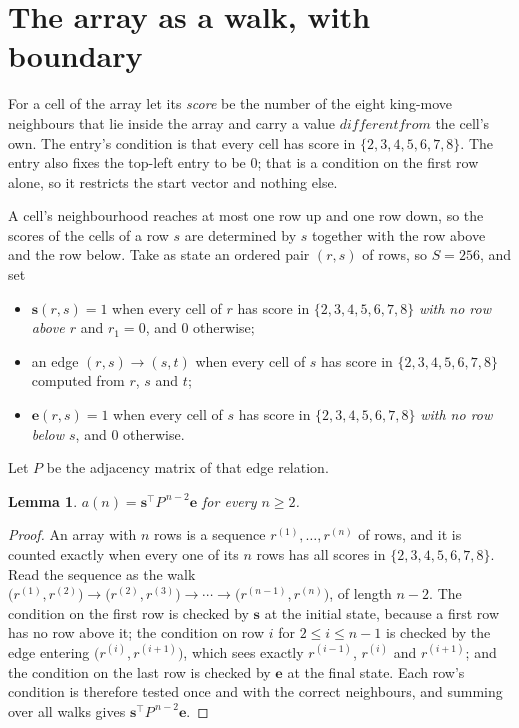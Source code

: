 \documentclass[11pt,a4paper]{article}
\theoremstyle{plain}
\newtheorem{lemma}[theorem]{Lemma}
\theoremstyle{definition}
\begin{document}
\section{The array as a walk, with boundary}

For a cell of the array let its \emph{score} be the number of the eight king-move neighbours that lie inside
the array and carry a value $different from$ the cell's own. The entry's condition is that every cell
has score in $\{2,3,4,5,6,7,8\}$. The entry also fixes the top-left entry to be $0$; that is a condition on the first row alone, so it restricts the start vector and nothing else.

A cell's neighbourhood reaches at most one row up and one row down, so the scores of the
cells of a row $s$ are determined by $s$ together with the row above and the row below.
Take as state an ordered pair $(r,s)$ of rows, so $S=256$, and set
\begin{itemize}
\item $\mathbf{s}(r,s)=1$ when every cell of $r$ has score in $\{2,3,4,5,6,7,8\}$ \emph{with no row
above $r$} and $r_1=0$, and $0$ otherwise;
\item an edge $(r,s)\to(s,t)$ when every cell of $s$ has score in $\{2,3,4,5,6,7,8\}$ computed from
$r$, $s$ and $t$;
\item $\mathbf{e}(r,s)=1$ when every cell of $s$ has score in $\{2,3,4,5,6,7,8\}$ \emph{with no row
below $s$}, and $0$ otherwise.
\end{itemize}
Let $P$ be the adjacency matrix of that edge relation.

\begin{lemma}\label{lem:walk}
$a(n)=\mathbf{s}^{\!\top}P^{\,n-2}\mathbf{e}$ for every $n\ge2$.
\end{lemma}

\begin{proof}
An array with $n$ rows is a sequence $r^{(1)},\dots,r^{(n)}$ of rows, and it is counted
exactly when every one of its $n$ rows has all scores in $\{2,3,4,5,6,7,8\}$. Read the sequence as the
walk $\bigl(r^{(1)},r^{(2)}\bigr)\to\bigl(r^{(2)},r^{(3)}\bigr)\to\cdots\to
\bigl(r^{(n-1)},r^{(n)}\bigr)$, of length $n-2$. The condition on the first row is
checked by $\mathbf{s}$ at the initial state, because a first row has no row above it; the
condition on row $i$ for $2\le i\le n-1$ is checked by the edge entering
$\bigl(r^{(i)},r^{(i+1)}\bigr)$, which sees exactly $r^{(i-1)}$, $r^{(i)}$ and
$r^{(i+1)}$; and the condition on the last row is checked by $\mathbf{e}$ at the final
state. Each row's condition is therefore tested once and with the correct neighbours, and
summing over all walks gives $\mathbf{s}^{\!\top}P^{\,n-2}\mathbf{e}$.
\end{proof}
\end{document}
